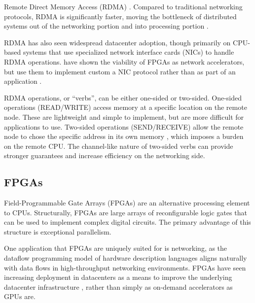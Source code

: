 Remote Direct Memory Access (RDMA) . Compared to traditional networking protocols, RDMA is significantly faster, moving the bottleneck of distributed systems out of the networking portion and into processing portion \cite{binnig-vldb-2016}.

RDMA has also seen widespread datacenter adoption, though primarily on CPU-based systems that use specialized network interface cards (NICs) to handle RDMA operations.
\citeauthor{star} have shown the viability of FPGAs as network accelerators, but use them to implement custom a NIC protocol rather than as part of an application \cite{star}.

RDMA operations, or ``verbs'', can be either one-sided or two-sided. One-sided operations (READ/WRITE) access memory at a specific location on the remote node. These are lightweight and simple to implement, but are more difficult for applications to use. Two-sided operations (SEND/RECEIVE) allow the remote node to chose the specific address in its own memory \cite{base}, which imposes a burden on the remote CPU. The channel-like nature of two-sided verbs can provide stronger guarantees and increase efficiency on the networking side.


\subsection{FPGAs}

Field-Programmable Gate Arrays (FPGAs) are an alternative processing element to CPUs. Structurally, FPGAs are large arrays of reconfigurable logic gates that can be used to implement complex digital circuits. The primary advantage of this structure is exceptional parallelism.

One application that FPGAs are uniquely suited for is networking, as the dataflow programming model of hardware description languages aligns naturally with data flows in high-throughput networking environments.
FPGAs have seen increasing deployment in datacenters as a means to improve the underlying datacenter infrastructure \cite{bobda-trets-2022,fang-vldb-2020}, rather than simply as on-demand accelerators as GPUs are.


